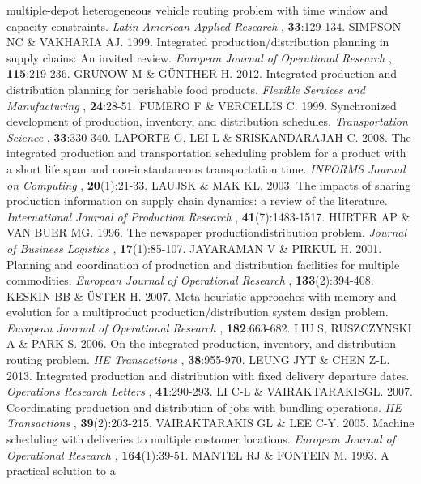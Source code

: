 \begin{biblio}[REFERENCES]
 multiple-depot heterogeneous vehicle routing problem with time window and capacity
 constraints. \textit{Latin American Applied Research} ,
 \textbf{33}:129-134.
 SIMPSON NC \& VAKHARIA AJ. 1999. Integrated
 production/distribution planning in supply chains: An invited review.
 \textit{European Journal of Operational Research} ,
 \textbf{115}:219-236.
 GRUNOW M \& GÜNTHER H. 2012. Integrated production
 and distribution planning for perishable food products. \textit{Flexible Services and
 Manufacturing} , \textbf{24}:28-51.
\tit{ }FUMERO F \& VERCELLIS C. 1999. Synchronized development of
 production, inventory, and distribution schedules. \textit{Transportation
 Science} , \textbf{33}:330-340.
 LAPORTE G, LEI L \& SRISKANDARAJAH C. 2008. The
 integrated production and transportation scheduling problem for a product with a
 short life span and non-instantaneous transportation time. \textit{INFORMS Journal on
 Computing} , \textbf{20}(1):21-33.
 LAUJSK \& MAK KL. 2003. The impacts of sharing
 production information on supply chain dynamics: a review of the literature.
 \textit{International Journal of Production Research} ,
 \textbf{41}(7):1483-1517.
\tit{ }HURTER AP \& VAN BUER MG. 1996. The newspaper
 productiondistribution problem. \textit{Journal of Business Logistics} ,
 \textbf{17}(1):85-107.
\tit{ }JAYARAMAN V \& PIRKUL H. 2001. Planning and coordination of
 production and distribution facilities for multiple commodities. \textit{European
 Journal of Operational Research} ,
 \textbf{133}(2):394-408.
\tit{ }KESKIN BB \& ÜSTER H. 2007. Meta-heuristic approaches with
 memory and evolution for a multiproduct production/distribution system design
 problem. \textit{European Journal of Operational Research} ,
 \textbf{182}:663-682.
 LIU S, RUSZCZYNSKI A \& PARK S. 2006. On the integrated
 production, inventory, and distribution routing problem. \textit{IIE
 Transactions} , \textbf{38}:955-970.
\tit{ }LEUNG JYT \& CHEN Z-L. 2013. Integrated production and
 distribution with fixed delivery departure dates. \textit{Operations Research
 Letters} , \textbf{41}:290-293.
\tit{ }LI C-L \& VAIRAKTARAKISGL. 2007. Coordinating production and
 distribution of jobs with bundling operations. \textit{IIE Transactions} ,
 \textbf{39}(2):203-215.
 VAIRAKTARAKIS GL \& LEE C-Y. 2005. Machine scheduling
 with deliveries to multiple customer locations. \textit{European Journal of
 Operational Research} , \textbf{164}(1):39-51.
\tit{ }MANTEL RJ \& FONTEIN M. 1993. A practical solution to a

\end{biblio}
